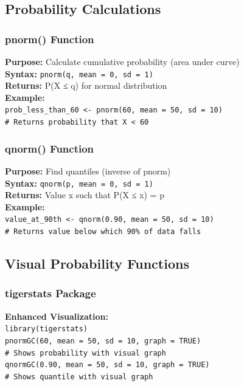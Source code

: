 \documentclass[11pt,a4paper]{article}
\begin{document}
\subsection{Probability Calculations}

\subsubsection{pnorm() Function}

\begin{formulabox}
\textbf{Purpose:} Calculate cumulative probability (area under curve)\\[0.3cm]
\textbf{Syntax:} \texttt{pnorm(q, mean = 0, sd = 1)}\\[0.3cm]
\textbf{Returns:} P(X ≤ q) for normal distribution\\[0.3cm]
\textbf{Example:}\\
\texttt{prob\_less\_than\_60 <- pnorm(60, mean = 50, sd = 10)}\\
\texttt{# Returns probability that X < 60}
\end{formulabox}

\subsubsection{qnorm() Function}

\begin{formulabox}
\textbf{Purpose:} Find quantiles (inverse of pnorm)\\[0.3cm]
\textbf{Syntax:} \texttt{qnorm(p, mean = 0, sd = 1)}\\[0.3cm]
\textbf{Returns:} Value x such that P(X ≤ x) = p\\[0.3cm]
\textbf{Example:}\\
\texttt{value\_at\_90th <- qnorm(0.90, mean = 50, sd = 10)}\\
\texttt{# Returns value below which 90\% of data falls}
\end{formulabox}

\subsection{Visual Probability Functions}

\subsubsection{tigerstats Package}

\begin{formulabox}
\textbf{Enhanced Visualization:}\\
\texttt{library(tigerstats)}\\[0.3cm]
\texttt{pnormGC(60, mean = 50, sd = 10, graph = TRUE)}\\
\texttt{# Shows probability with visual graph}\\[0.3cm]
\texttt{qnormGC(0.90, mean = 50, sd = 10, graph = TRUE)}\\
\texttt{# Shows quantile with visual graph}
\end{formulabox}
\end{document}
